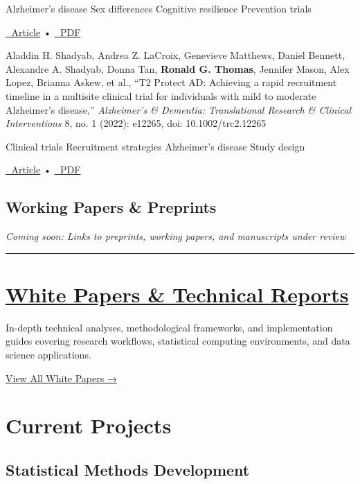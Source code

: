\documentclass[
  letterpaper,
  DIV=11,
  numbers=noendperiod]{scrartcl}
\begin{document}
{Alzheimer's disease} {Sex differences} {Cognitive resilience}
{Prevention trials}

\href{https://doi.org/10.1002/alz.12571}{🔗 Article} •
\href{https://doi.org/10.1002/alz.12571}{📄 PDF}

Aladdin H. Shadyab, Andrea Z. LaCroix, Genevieve Matthews, Daniel
Bennett, Alexandre A. Shadyab, Donna Tan, \textbf{Ronald G. Thomas},
Jennifer Mason, Alex Lopez, Brianna Askew, et al., ``T2 Protect AD:
Achieving a rapid recruitment timeline in a multisite clinical trial for
individuals with mild to moderate Alzheimer's disease,''
\emph{Alzheimer's \& Dementia: Translational Research \& Clinical
Interventions} 8, no. 1 (2022): e12265, doi: 10.1002/trc2.12265

{Clinical trials} {Recruitment strategies} {Alzheimer's disease} {Study
design}

\href{https://doi.org/10.1002/trc2.12265}{🔗 Article} •
\href{https://doi.org/10.1002/trc2.12265}{📄 PDF}

\subsection{Working Papers \& Preprints}\label{working-papers-preprints}

\emph{Coming soon: Links to preprints, working papers, and manuscripts
under review}

\begin{center}\rule{0.5\linewidth}{0.5pt}\end{center}

\section{\texorpdfstring{\href{../research/white-papers/}{White Papers
\& Technical
Reports}}{White Papers \& Technical Reports}}\label{white-papers-technical-reports}

In-depth technical analyses, methodological frameworks, and
implementation guides covering research workflows, statistical computing
environments, and data science applications.

\href{../research/white-papers/}{View All White Papers →}

\section{Current Projects}\label{current-projects}

\subsection{Statistical Methods
Development}\label{statistical-methods-development}
\end{document}
